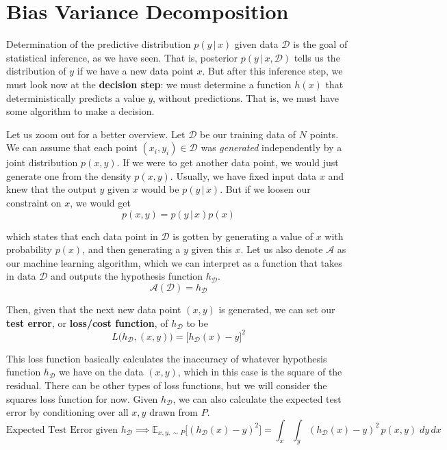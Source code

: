 \section{Bias Variance Decomposition}

  Determination of the predictive distribution $p(y\,|\,x)$ given data $\mathcal{D}$ is the goal of statistical inference, as we have seen. That is, posterior $p(y\,|\,x, \mathcal{D})$ tells us the distribution of $y$ if we have a new data point $x$. But after this inference step, we must look now at the \textbf{decision step}: we must determine a function $h(x)$ that deterministically predicts a value $y$, without predictions. That is, we must have some algorithm to make a decision.

  Let us zoom out for a better overview. Let $\mathcal{D}$ be our training data of $N$ points. We can assume that each point $(x_i, y_i) \in \mathcal{D}$ was \textit{generated} independently by a joint distribution $p(x, y)$. If we were to get another data point, we would just generate one from the density $p(x, y)$. Usually, we have fixed input data $x$ and knew that the output $y$ given $x$ would be $p(y\,|\,x)$. But if we loosen our constraint on $x$, we would get
  \begin{equation}
    p(x, y) = p(y\,|\,x) p(x)
  \end{equation}

  which states that each data point in $\mathcal{D}$ is gotten by generating a value of $x$ with probability $p(x)$, and then generating a $y$ given this $x$. Let us also denote $\mathcal{A}$ as our machine learning algorithm, which we can interpret as a function that takes in data $\mathcal{D}$ and outputs the hypothesis function $h_\mathcal{D}$.
  \begin{equation}
    \mathcal{A} (\mathcal{D}) = h_\mathcal{D}
  \end{equation}

  Then, given that the next new data point $(x, y)$ is generated, we can set our \textbf{test error}, or \textbf{loss/cost function}, of $h_\mathcal{D}$ to be
  \begin{equation}
    L\big(h_\mathcal{D}, (x, y) \big) = \big[ h_\mathcal{D} (x) - y \big]^2
  \end{equation}

  This loss function basically calculates the inaccuracy of whatever hypothesis function $h_\mathcal{D}$ we have on the data $(x, y)$, which in this case is the square of the residual. There can be other types of loss functions, but we will consider the squares loss function for now. Given $h_\mathcal{D}$, we can also calculate the expected test error by conditioning over all $x, y$ drawn from $P$.
  \begin{equation}
    \text{Expected Test Error given } h_\mathcal{D} \implies \mathbb{E}_{x, y, \sim P} \big[ (h_\mathcal{D} (x) - y)^2 \big] = \int_x \int_y (h_\mathcal{D} (x) - y)^2 \, p(x, y)\; dy \, dx
  \end{equation}

